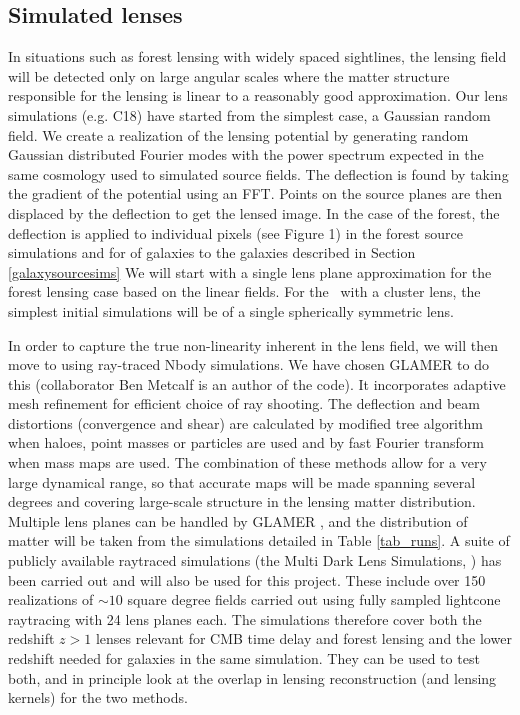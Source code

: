 \subsection{Simulated lenses}
In situations such as forest lensing with widely spaced sightlines, 
the lensing field will be detected only on large angular scales 
where the matter structure responsible for the lensing is linear to a
reasonably good approximation. Our lens simulations (e.g. C18)
have started from the simplest case, a Gaussian random field.   
We create a realization of the lensing potential by generating random 
Gaussian  distributed Fourier modes with the power spectrum expected 
in the same cosmology
 used to simulated source fields.   The deflection is found by taking the 
gradient of the potential using an FFT.  Points on the source planes 
are then displaced by the deflection to get the lensed image. 
In the case of the forest, the deflection is applied to individual pixels
(see Figure 1) in the forest source simulations
 and for \atf of galaxies to the galaxies 
described in Section \ref{galaxysourcesims}
We will start with a single lens plane approximation for the forest lensing
case based on the linear fields. For the \atf\  with a cluster lens, the 
simplest initial simulations will be of a single spherically  symmetric lens.

In order to capture the true non-linearity inherent in the lens field,
 we will then move to using ray-traced  Nbody simulations. We have chosen  
GLAMER   \cite{metcalf2014} to do this (collaborator Ben Metcalf is an 
author of the code). It incorporates adaptive mesh refinement for
efficient choice of ray shooting. The deflection and beam distortions 
(convergence and shear) are calculated by modified tree algorithm when haloes,
 point masses or particles are used and by fast Fourier transform when 
mass maps are used. The combination of these methods allow for a very 
large dynamical range, so that accurate  maps will be made
spanning several degrees and covering large-scale
structure in the lensing matter distribution. Multiple lens planes can be
handled by GLAMER \cite{petkova2014}, and the distribution of matter
will be taken from the simulations detailed in Table \ref{tab_runs}. A suite 
of publicly available raytraced simulations (the Multi Dark Lens Simulations,
\cite{giocoli2016}) has been carried out and will also be used for 
this project. These include over 150 realizations of $\sim 10$ square
degree fields carried out using fully sampled lightcone raytracing
with 24 lens planes each. The simulations therefore cover both the
redshift $z > 1$ lenses relevant for CMB time delay 
and forest lensing and the lower 
redshift needed for galaxies in the same simulation. They can be used to
test both, and in principle look at the overlap in lensing reconstruction
(and lensing kernels) for the two methods. 



